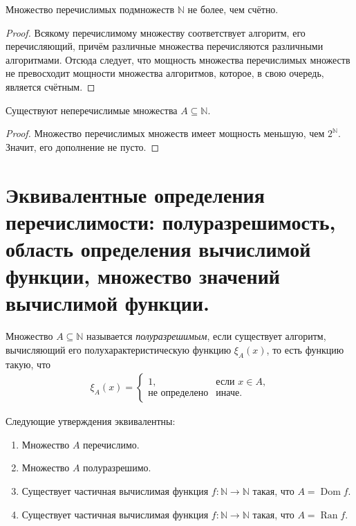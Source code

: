\documentclass{article}
\begin{document}
    \begin{statement}
        Множество перечислимых подмножеств $\mathbb{N}$ не более, чем счётно.
    \end{statement}
    \begin{proof}
        Всякому перечислимому множеству соответствует алгоритм, его перечисляющий, причём различные множества
        перечисляются различными алгоритмами. Отсюда следует, что мощность множества перечислимых множеств не
        превосходит мощности множества алгоритмов, которое, в свою очередь, является счётным.
    \end{proof}

    \begin{theorem}
        Существуют неперечислимые множества $A \subseteq \mathbb{N}$.
    \end{theorem}
    \begin{proof}
        Множество перечислимых множеств имеет мощность меньшую, чем $2^\mathbb{N}$. Значит, его дополнение
        не пусто.
    \end{proof}

    \section{Эквивалентные определения перечислимости: полуразрешимость, область определения
    вычислимой функции, множество значений вычислимой функции.}

    \begin{definition}
        Множество $A \subseteq \mathbb{N}$ называется \textit{полуразрешимым}, если существует алгоритм,
        вычисляющий его полухарактеристическую функцию $\xi_A(x)$, то есть функцию такую, что
        \begin{gather*}
            \xi_A(x) =
            \begin{cases}
                1, & \text{если $x \in A$,}\\
                \text{не определено} & \text{иначе.}
            \end{cases}
        \end{gather*}
    \end{definition}

    \begin{theorem}
        Следующие утверждения эквивалентны:
        \begin{enumerate}
            \item Множество $A$ перечислимо.
            \item Множество $A$ полуразрешимо.
            \item Существует частичная вычислимая функция $f: \mathbb{N} \to \mathbb{N}$ такая, что
                $A = \operatorname{Dom} f$.
            \item Существует частичная вычислимая функция $f: \mathbb{N} \to \mathbb{N}$ такая, что
                $A = \operatorname{Ran} f$.
        \end{enumerate}
    \end{theorem}
\end{document}
